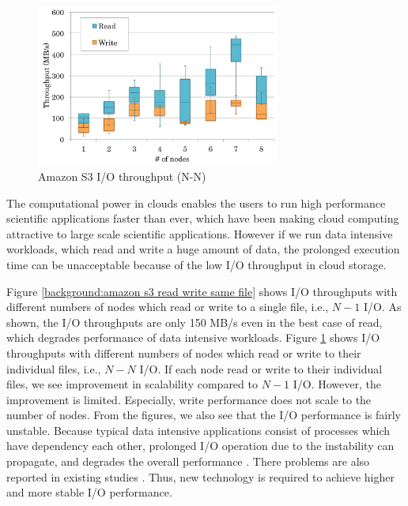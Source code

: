 \begin{figure}[t]
\label{background:amazon s3 read write different file}
\includegraphics[width=8cm]{img/s3_read_write_different_file-2}
\caption{Amazon S3 I/O throughput (N-N)}
\end{figure}





The computational power in clouds enables the users to run high performance
scientific applications faster than ever, which have been making cloud
computing attractive to large scale scientific applications.
However if we run data intensive workloads, which read and write a huge amount
of data, the prolonged execution time can be unacceptable because of the low I/O
throughput in cloud storage.
\par
{}
Figure \ref{background:amazon s3 read write same file} shows I/O throughputs
with different numbers of nodes which read or write to a single file, i.e.,
$N-1$ I/O.
As shown, the I/O throughputs are only 150 MB/s even in the best case of read,
which degrades performance of data intensive workloads. 
Figure \ref{background:amazon s3 read write different file} shows I/O
throughputs with different numbers of nodes which read or write to their
individual files, i.e., $N-N$ I/O. If each node read or write to their
individual files, we see improvement in scalability compared to $N-1$ I/O. 
However, the improvement is limited. Especially, write performance does not
scale to the number of nodes. From the figures, we also see that the I/O
performance is fairly unstable. Because typical data intensive applications consist of
processes which have dependency each other, prolonged I/O
operation due to the instability can propagate, and degrades the overall
performance \cite{montage, povray}.
There problems are also reported in existing studies \cite{Chiba,Transactions_a_la_carte, Interactive_Use_of_Cloud_Services,Amazon_S3_for_Science_Grids,
anevaluation}. 
Thus, new technology is required to achieve higher and more stable I/O
performance.

